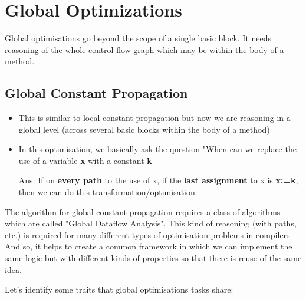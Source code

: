 

\section{Global Optimizations}

Global optimisations go beyond the scope of a single basic block. It needs reasoning of the whole control flow graph which may be within the body of a method.


\subsection{Global Constant Propagation}

\begin{itemize}
    \item This is similar to local constant propagation but now we are reasoning in a global level (across several basic blocks within the body of a method)
    \item In this optimisation, we basically ask the question "When can we replace the use of a variable \textbf{x} with a constant \textbf{k}
    
    Ans: If on \textbf{every path} to the use of x, if the \textbf{last assignment} to x is \textbf{x:=k}, then we can do this transformation/optimisation.
\end{itemize}


The algorithm for global constant propagation requires a class of algorithms which are called "Global Dataflow Analysis". This kind of reasoning (with paths, etc.) is required for many different types of optimisation problems in compilers. And so, it helps to create a common framework in which we can implement the same logic but with different kinds of properties so that there is reuse of the same idea.

Let's identify some traits that global optimisations tasks share:

